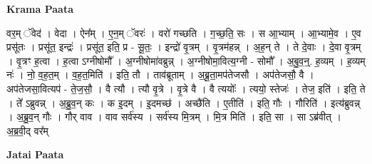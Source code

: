 \documentclass[17pt]{extarticle}
\begin{document}
\textbf{Krama Paata} \newline

वर॒म् ॅवेद॑ । वेदा । ऐन᳚म् । ए॒न॒म् ॅवरः॑ । वरो॑ गच्छति । ग॒च्छ॒ति॒ सः । स आ॒भ्याम् । आ॒भ्यामे॒व । ए॒व प्रसू॑तः । प्रसू॑त॒ इन्द्रः॑ । प्रसू॑त॒ इति॒ प्र - सू॒तः॒ । इन्द्रो॑ वृ॒त्रम् । वृ॒त्रम॑हन्न् । अ॒ह॒न् ते । ते दे॒वाः । दे॒वा वृ॒त्रम् । वृ॒त्रꣳ ह॒त्वा । ह॒त्वा ऽग्नीषोमौ᳚ । अ॒ग्नीषोमा॑वब्रुन्न् । अ॒ग्नीषोमा॒वित्य॒ग्नी - सोमौ᳚ । अ॒बु॒व॒न्॒. ह॒व्यम् । ह॒व्यम् नः॑ । नो॒ व॒ह॒त॒म् । व॒ह॒त॒मिति॑ । इति॒ तौ । ताव॑ब्रूताम् । अ॒ब्रू॒ता॒मप॑तेजसौ । अप॑तेजसौ॒ वै । अप॑तेजसा॒वित्यप॑ - ते॒ज॒सौ॒ । वै त्यौ । त्यौ वृ॒त्रे । वृ॒त्रे वै । वै त्ययोः᳚ । त्ययो॒ स्तेजः॑ । तेज॒ इति॑ । इति॒ ते । ते᳚ ऽब्रुवन्न् । अ॒ब्रु॒व॒न् कः । क इ॒दम् । इ॒दमच्छ॑ । अच्छै॑ति । ए॒तीति॑ । इति॒ गौः । गौरिति॑ । इत्य॑ब्रुवन्न् । अ॒ब्रु॒व॒न् गौः । गौर् वाव । वाव सर्व॑स्य । सर्व॑स्य मि॒त्रम् । मि॒त्र मिति॑ । इति॒ सा । सा ऽब्र॑वीत् । अ॒ब्र॒वी॒द् वर᳚म् \newline

\textbf{Jatai Paata} \newline
\end{document}
